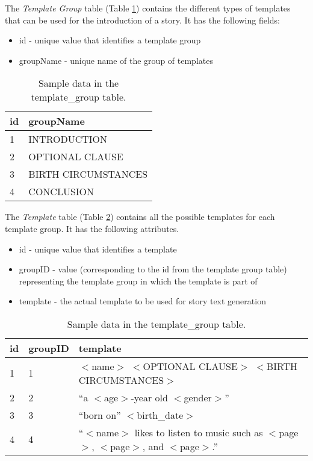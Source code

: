 The \textit{Template Group} table (Table \ref{tab:Template1}) contains the different types of templates that can be used for the introduction of a story. It has the following fields:
\begin{itemize}
	\item id - unique value that identifies a template group
	\item groupName - unique name of the group of templates
\end{itemize}

\begin{table}[ph!]   %
	\centering
	\caption{Sample data in the template\_group table.} \vspace{0.25em}
	\begin{tabular}{|p{1.5cm}|p{2in}|} \hline
		\textbf{id} & \textbf{groupName} \\ \hline
		1 & INTRODUCTION \\ \hline
		2 & OPTIONAL CLAUSE \\ \hline
		3 & BIRTH CIRCUMSTANCES \\ \hline
		4 & CONCLUSION \\ \hline
	\end{tabular}
	\label{tab:Template1}
\end{table}

The \textit{Template} table (Table \ref{tab:Template2}) contains all the possible templates for each template group. It has the following attributes.
\begin{itemize}
	\item id - unique value that identifies a template
	\item groupID - value (corresponding to the id from the template group table) representing the template group in which the template is part of
	\item template - the actual template to be used for story text generation
\end{itemize}

\begin{table}[ph!]   %
	\centering
	\caption{Sample data in the template\_group table.} \vspace{0.25em}
	\begin{tabular}{|p{1.5cm}|p{1.5in}|p{1.5in}|} \hline
		\textbf{id} & \textbf{groupID} & \textbf{template} \\ \hline
		1 & 1 & $<$name$>$ $<$OPTIONAL CLAUSE$>$ $<$BIRTH CIRCUMSTANCES$>$ \\ \hline
		2 & 2 & ``a $<$age$>$-year old $<$gender$>$'' \\ \hline
		3 & 3 & ``born on'' $<$birth\_date$>$ \\ \hline
		4 & 4 & ``$<$name$>$ likes to listen to music such as $<$page$>$, $<$page$>$, and $<$page$>$.'' \\ \hline
	\end{tabular}
	\label{tab:Template2}
\end{table}

